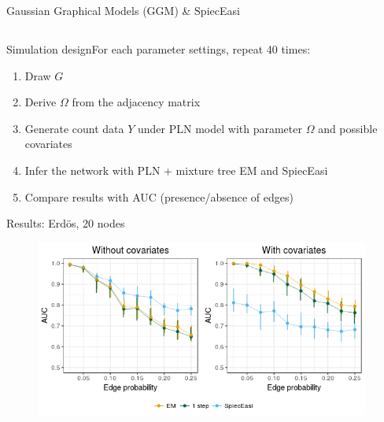 \documentclass{beamer}
\newcommand{\emphase}[1]{\textcolor{Complement}{#1}}
\begin{document}
\begin{frame}{Gaussian Graphical Models (GGM) \& SpiecEasi}

\end{frame}

\subsection{}

\begin{frame}{Simulation design}For each parameter settings, repeat 40 times:\bigskip

\begin{enumerate}
     \item Draw \emphase{$G$} \vspace{0.3cm}
     \item Derive \emphase{$\Omega$}  from the adjacency matrix\vspace{0.3cm} 
     \item Generate count data \emphase{$Y$} under PLN model with parameter $\Omega$ and possible covariates
     \item Infer the network with \emphase{PLN + mixture tree EM}  and \emphase{SpiecEasi} \vspace{0.3cm}
     \item Compare results with \emphase{AUC} (presence/absence of edges)
\end{enumerate}

	
\end{frame}

\begin{frame}{Results: Erdös, 20 nodes}
\begin{figure}[htp]
\centering
\includegraphics[width=11cm]{mosaic.png}
\end{figure}
\end{frame}
\end{document}
